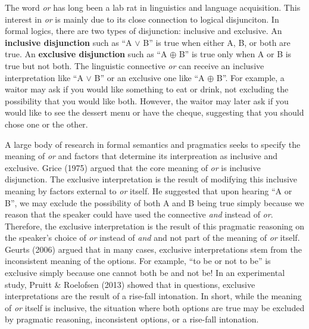 \documentclass[10pt, letterpaper]{article}
\begin{document}
The word \emph{or} has long been a lab rat in linguistics and language
acquisition. This interest in \emph{or} is mainly due to its close
connection to logical disjunciton. In formal logics, there are two types
of disjunction: inclusive and exclusive. An \textbf{inclusive
disjunction} such as ``A \(\vee\) B'' is true when either A, B, or both
are true. An \textbf{exclusive disjunction} such as ``A \(\oplus\) B''
is true only when A or B is true but not both. The linguistic connective
\emph{or} can receive an inclusive interpretation like ``A \(\vee\) B''
or an exclusive one like ``A \(\oplus\) B''. For example, a waitor may
ask if you would like something to eat or drink, not excluding the
possibility that you would like both. However, the waitor may later ask
if you would like to see the dessert menu or have the cheque, suggesting
that you should chose one or the other.

A large body of research in formal semantics and pragmatics seeks to
specify the meaning of \emph{or} and factors that determine its
interpreation as inclusive and exclusive. Grice (1975) argued that the
core meaning of \emph{or} is inclusive disjunction. The exclusive
interpretation is the result of modifying this inclusive meaning by
factors external to \emph{or} itself. He suggested that upon hearing ``A
or B'', we may exclude the possibility of both A and B being true simply
because we reason that the speaker could have used the connective
\emph{and} instead of \emph{or}. Therefore, the exclusive interpretation
is the result of this pragmatic reasoning on the speaker's choice of
\emph{or} instead of \emph{and} and not part of the meaning of \emph{or}
itself. Geurts (2006) argued that in many cases, exclusive
interpretations stem from the inconsistent meaning of the options. For
example, ``to be or not to be'' is exclusive simply because one cannot
both be and not be! In an experimental study, Pruitt \& Roelofsen (2013)
showed that in questions, exclusive interpretations are the result of a
rise-fall intonation. In short, while the meaning of \emph{or} itself is
inclusive, the situation where both options are true may be excluded by
pragmatic reasoning, inconsistent options, or a rise-fall intonation.
\end{document}
